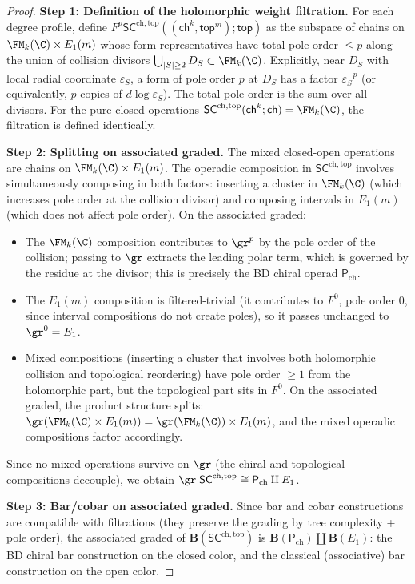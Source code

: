 \begin{proof}
\textbf{Step 1: Definition of the holomorphic weight filtration.}
For each degree profile, define $F^p \mathsf{SC}^{\mathrm{ch,top}}((\mathsf{ch}^k, \mathsf{top}^m); \mathsf{top})$ as the subspace of chains on $\FM_k(\C) \times E_1(m)$ whose form representatives have total pole order $\le p$ along the union of collision divisors $\bigcup_{|S| \ge 2} D_S \subset \FM_k(\C)$. Explicitly, near $D_S$ with local radial coordinate $\varepsilon_S$, a form of pole order $p$ at $D_S$ has a factor $\varepsilon_S^{-p}$ (or equivalently, $p$ copies of $d\log\varepsilon_S$). The total pole order is the sum over all divisors. For the pure closed operations $\mathsf{SC}^{\mathrm{ch,top}}(\mathsf{ch}^k; \mathsf{ch}) = \FM_k(\C)$, the filtration is defined identically.

\textbf{Step 2: Splitting on associated graded.}
The mixed closed-open operations are chains on $\FM_k(\C) \times E_1(m)$. The operadic composition in $\mathsf{SC}^{\mathrm{ch,top}}$ involves simultaneously composing in both factors: inserting a cluster in $\FM_k(\C)$ (which increases pole order at the collision divisor) and composing intervals in $E_1(m)$ (which does not affect pole order). On the associated graded:
\begin{itemize}
\item The $\FM_k(\C)$ composition contributes to $\gr^p$ by the pole order of the collision; passing to $\gr$ extracts the leading polar term, which is governed by the residue at the divisor; this is precisely the BD chiral operad $\mathsf{P}_{\mathrm{ch}}$.
\item The $E_1(m)$ composition is filtered-trivial (it contributes to $F^0$, pole order 0, since interval compositions do not create poles), so it passes unchanged to $\gr^0 = E_1$.
\item Mixed compositions (inserting a cluster that involves both holomorphic collision and topological reordering) have pole order $\ge 1$ from the holomorphic part, but the topological part sits in $F^0$. On the associated graded, the product structure splits: $\gr(\FM_k(\C) \times E_1(m)) = \gr(\FM_k(\C)) \times E_1(m)$, and the mixed operadic compositions factor accordingly.
\end{itemize}
Since no mixed operations survive on $\gr$ (the chiral and topological compositions decouple), we obtain $\gr\;\mathsf{SC}^{\mathrm{ch,top}} \cong \mathsf{P}_{\mathrm{ch}} \amalg E_1$.

\textbf{Step 3: Bar/cobar on associated graded.}
Since bar and cobar constructions are compatible with filtrations (they preserve the grading by tree complexity + pole order), the associated graded of $\mathbf{B}(\mathsf{SC}^{\mathrm{ch,top}})$ is $\mathbf{B}(\mathsf{P}_{\mathrm{ch}}) \amalg \mathbf{B}(E_1)$: the BD chiral bar construction on the closed color, and the classical (associative) bar construction on the open color.
\end{proof}

